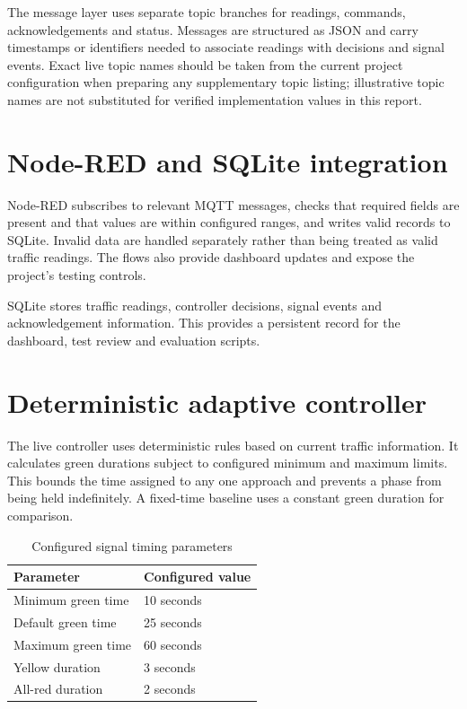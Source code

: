 \documentclass[12pt,a4paper,oneside]{report}
\begin{document}
The message layer uses separate topic branches for readings, commands, acknowledgements and status. Messages are structured as JSON and carry timestamps or identifiers needed to associate readings with decisions and signal events. Exact live topic names should be taken from the current project configuration when preparing any supplementary topic listing; illustrative topic names are not substituted for verified implementation values in this report.

\section{Node-RED and SQLite integration}
Node-RED subscribes to relevant MQTT messages, checks that required fields are present and that values are within configured ranges, and writes valid records to SQLite. Invalid data are handled separately rather than being treated as valid traffic readings. The flows also provide dashboard updates and expose the project's testing controls.

SQLite stores traffic readings, controller decisions, signal events and acknowledgement information. This provides a persistent record for the dashboard, test review and evaluation scripts.

\section{Deterministic adaptive controller}
The live controller uses deterministic rules based on current traffic information. It calculates green durations subject to configured minimum and maximum limits. This bounds the time assigned to any one approach and prevents a phase from being held indefinitely. A fixed-time baseline uses a constant green duration for comparison.

\begin{table}[htbp]\centering\small
\caption{Configured signal timing parameters}\label{tab:ctrl-params}
\begin{tabular}{|p{}|p{}|}\hline
\textbf{Parameter} & \textbf{Configured value} \\\hline
Minimum green time & 10 seconds \\\hline
Default green time & 25 seconds \\\hline
Maximum green time & 60 seconds \\\hline
Yellow duration & 3 seconds \\\hline
All-red duration & 2 seconds \\\hline
\end{tabular}\end{table}
\end{document}
